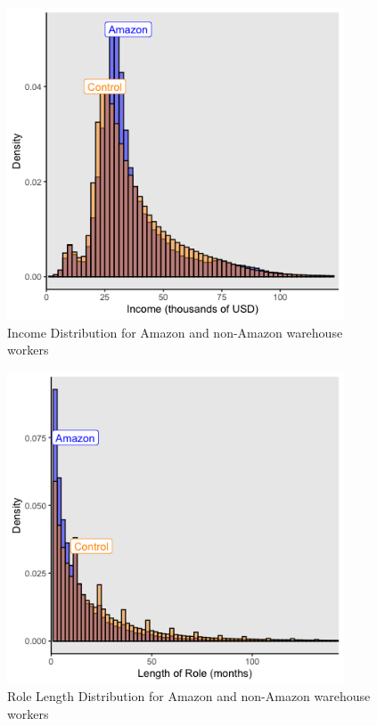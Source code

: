 \documentclass[11pt]{article}
\begin{document}
\begin{figure}[H]
\centering
\includegraphics[width=10cm]{Rplot01.png}
\caption{Income Distribution for Amazon and non-Amazon warehouse workers}
\end{figure}

\begin{figure}[H]
\centering
\includegraphics[width=10cm]{Rplot02.png}
\caption{Role Length Distribution for Amazon and non-Amazon warehouse workers}
\end{figure}
\end{document}
